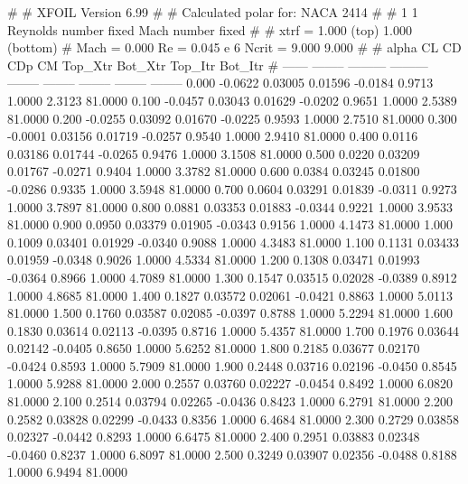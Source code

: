 #  
#       XFOIL         Version 6.99
#  
# Calculated polar for: NACA 2414                                       
#  
# 1 1 Reynolds number fixed          Mach number fixed         
#  
# xtrf =   1.000 (top)        1.000 (bottom)  
# Mach =   0.000     Re =     0.045 e 6     Ncrit =   9.000  9.000
#  
#   alpha    CL        CD       CDp       CM     Top_Xtr  Bot_Xtr  Top_Itr  Bot_Itr
#  ------ -------- --------- --------- -------- -------- -------- -------- --------
   0.000  -0.0622   0.03005   0.01596  -0.0184   0.9713   1.0000   2.3123  81.0000
   0.100  -0.0457   0.03043   0.01629  -0.0202   0.9651   1.0000   2.5389  81.0000
   0.200  -0.0255   0.03092   0.01670  -0.0225   0.9593   1.0000   2.7510  81.0000
   0.300  -0.0001   0.03156   0.01719  -0.0257   0.9540   1.0000   2.9410  81.0000
   0.400   0.0116   0.03186   0.01744  -0.0265   0.9476   1.0000   3.1508  81.0000
   0.500   0.0220   0.03209   0.01767  -0.0271   0.9404   1.0000   3.3782  81.0000
   0.600   0.0384   0.03245   0.01800  -0.0286   0.9335   1.0000   3.5948  81.0000
   0.700   0.0604   0.03291   0.01839  -0.0311   0.9273   1.0000   3.7897  81.0000
   0.800   0.0881   0.03353   0.01883  -0.0344   0.9221   1.0000   3.9533  81.0000
   0.900   0.0950   0.03379   0.01905  -0.0343   0.9156   1.0000   4.1473  81.0000
   1.000   0.1009   0.03401   0.01929  -0.0340   0.9088   1.0000   4.3483  81.0000
   1.100   0.1131   0.03433   0.01959  -0.0348   0.9026   1.0000   4.5334  81.0000
   1.200   0.1308   0.03471   0.01993  -0.0364   0.8966   1.0000   4.7089  81.0000
   1.300   0.1547   0.03515   0.02028  -0.0389   0.8912   1.0000   4.8685  81.0000
   1.400   0.1827   0.03572   0.02061  -0.0421   0.8863   1.0000   5.0113  81.0000
   1.500   0.1760   0.03587   0.02085  -0.0397   0.8788   1.0000   5.2294  81.0000
   1.600   0.1830   0.03614   0.02113  -0.0395   0.8716   1.0000   5.4357  81.0000
   1.700   0.1976   0.03644   0.02142  -0.0405   0.8650   1.0000   5.6252  81.0000
   1.800   0.2185   0.03677   0.02170  -0.0424   0.8593   1.0000   5.7909  81.0000
   1.900   0.2448   0.03716   0.02196  -0.0450   0.8545   1.0000   5.9288  81.0000
   2.000   0.2557   0.03760   0.02227  -0.0454   0.8492   1.0000   6.0820  81.0000
   2.100   0.2514   0.03794   0.02265  -0.0436   0.8423   1.0000   6.2791  81.0000
   2.200   0.2582   0.03828   0.02299  -0.0433   0.8356   1.0000   6.4684  81.0000
   2.300   0.2729   0.03858   0.02327  -0.0442   0.8293   1.0000   6.6475  81.0000
   2.400   0.2951   0.03883   0.02348  -0.0460   0.8237   1.0000   6.8097  81.0000
   2.500   0.3249   0.03907   0.02356  -0.0488   0.8188   1.0000   6.9494  81.0000
